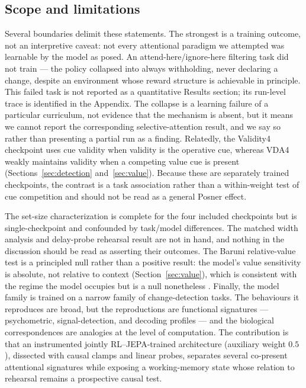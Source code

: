\subsection*{Scope and limitations}

Several boundaries delimit these statements. The strongest is a training
outcome, not an interpretive caveat: not every attentional paradigm we
attempted was learnable by the model as posed. An attend-here/ignore-here
filtering task did not train --- the policy collapsed into always
withholding, never declaring a change, despite an environment whose
reward structure is achievable in principle. This failed task is not reported as a
quantitative Results section; its run-level trace is identified in the Appendix. The collapse is a learning failure of a
particular curriculum, not evidence that the mechanism is absent, but it
means we cannot report the corresponding selective-attention result, and
we say so rather than presenting a partial run as a finding. Relatedly,
the Validity4 checkpoint uses cue validity when validity is the operative cue,
whereas VDA4 weakly maintains validity when a competing value cue is present
(Sections~\ref{sec:detection} and~\ref{sec:value}). Because these are separately
trained checkpoints, the contrast is a task association rather than a within-weight
test of cue competition and should not be read as a general Posner effect.

The set-size characterization is complete for the four included checkpoints but is
single-checkpoint and confounded by task/model differences. The matched width analysis
and delay-probe rehearsal result are not in hand, and nothing in the discussion should
be read as asserting their outcomes. The Baruni relative-value test is a principled
null rather than a positive result: the model's value sensitivity is absolute, not
relative to context (Section~\ref{sec:value}), which is consistent with the regime the
model occupies but is a null nonetheless \cite{baruni2015}. Finally, the model family
is trained on a narrow family of change-detection tasks. The behaviours it reproduces
are broad, but the reproductions are functional signatures --- psychometric,
signal-detection, and decoding profiles --- and the biological correspondences are
analogies at the level of computation. The contribution is that an instrumented
jointly RL--JEPA-trained architecture (auxiliary weight $0.5$), dissected with causal clamps and linear probes, separates
several co-present attentional signatures while exposing a working-memory state whose
relation to rehearsal remains a prospective causal test.

\label{fig:discussion-synthesis}
